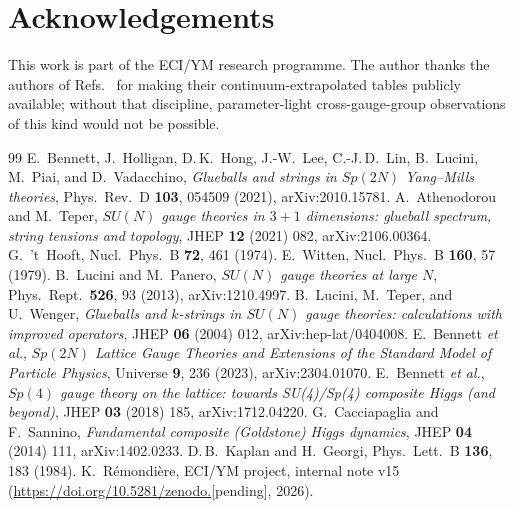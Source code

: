 \documentclass[aps,prd,reprint,nofootinbib,superscriptaddress,floatfix]{revtex4-2}
\begin{document}
\section*{Acknowledgements}
This work is part of the ECI/YM research programme. The author thanks the
authors of Refs.~\cite{BennettHolligan2021,AthenodorouTeper2021} for making
their continuum-extrapolated tables publicly available; without that
discipline, parameter-light cross-gauge-group observations of this kind
would not be possible.


\begin{thebibliography}{99}
   E.~Bennett, J.~Holligan, D.\,K.~Hong, J.-W.~Lee, C.-J.\,D.~Lin, B.~Lucini,
   M.~Piai, and D.~Vadacchino,
   {\it Glueballs and strings in $Sp(2N)$ Yang--Mills theories},
   Phys.\ Rev.\ D \textbf{103}, 054509 (2021), arXiv:2010.15781.
   A.~Athenodorou and M.~Teper,
   {\it $SU(N)$ gauge theories in $3+1$ dimensions: glueball spectrum,
        string tensions and topology},
   JHEP \textbf{12} (2021) 082, arXiv:2106.00364.
   G.~'t~Hooft, Nucl.\ Phys.\ B \textbf{72}, 461 (1974).
   E.~Witten, Nucl.\ Phys.\ B \textbf{160}, 57 (1979).
   B.~Lucini and M.~Panero,
   {\it $SU(N)$ gauge theories at large $N$},
   Phys.\ Rept.\ \textbf{526}, 93 (2013), arXiv:1210.4997.
   B.~Lucini, M.~Teper, and U.~Wenger,
   {\it Glueballs and $k$-strings in $SU(N)$ gauge theories: calculations
        with improved operators},
   JHEP \textbf{06} (2004) 012, arXiv:hep-lat/0404008.
   E.~Bennett \emph{et al.},
   {\it $Sp(2N)$ Lattice Gauge Theories and Extensions of the Standard Model
        of Particle Physics},
   Universe \textbf{9}, 236 (2023), arXiv:2304.01070.
   E.~Bennett \emph{et al.},
   {\it $Sp(4)$ gauge theory on the lattice: towards SU(4)/Sp(4) composite
        Higgs (and beyond)},
   JHEP \textbf{03} (2018) 185, arXiv:1712.04220.
   G.~Cacciapaglia and F.~Sannino,
   {\it Fundamental composite (Goldstone) Higgs dynamics},
   JHEP \textbf{04} (2014) 111, arXiv:1402.0233.
   D.\,B.~Kaplan and H.~Georgi, Phys.\ Lett.\ B \textbf{136}, 183 (1984).
   K.~R\'emondi\`ere, ECI/YM project, internal note v15
   (\url{https://doi.org/10.5281/zenodo.}\textsf{[pending]}, 2026).
\end{thebibliography}
\end{document}

